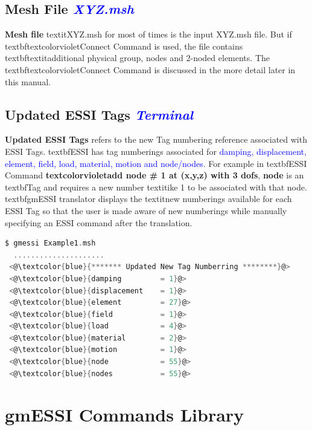 \documentclass[11pt]{article}
\begin{document}
\subsection{Mesh File \textcolor{blue}{\textit{XYZ.msh}}}

\textbf{Mesh file} textit{XYZ.msh} for most of times is the input XYZ.msh
file. But if textbf{textcolor{violet}{Connect Command}} is used, the file
contains textbf{textit{additional physical group, nodes and 2-noded
elements}}. The textbf{textcolor{violet}{Connect Command}} is discussed in
the more detail later in this manual.

\subsection{Updated ESSI Tags \textcolor{blue}{\textit{Terminal}}}

\textbf{Updated ESSI Tags} refers to the new Tag numbering reference
associated with ESSI Tags. textbf{ESSI} has tag numberings associated for
\textcolor{blue}{damping, displacement, element, field, load, material, motion
and node/nodes}. For example in textbf{ESSI Command}
\textbf{textcolor{violet}{add node \# 1  at (x,y,z)  with 3 dofs}},
\textbf{node} is an textbf{Tag} and requires a new number textit{ike 1 to be
associated with that node}. textbf{gmESSI translator} displays the textit{new
numberings available for each ESSI Tag} so that the user is made aware of new
numberings while manually specifying an ESSI command after the translation.

\begin{lstlisting}[language=C]
$ gmessi Example1.msh
  .....................
 <@\textcolor{blue}{******* Updated New Tag Numberring ********}@>
 <@\textcolor{blue}{damping         = 1}@>
 <@\textcolor{blue}{displacement    = 1}@>
 <@\textcolor{blue}{element         = 27}@>
 <@\textcolor{blue}{field           = 1}@>
 <@\textcolor{blue}{load            = 4}@>
 <@\textcolor{blue}{material        = 2}@>
 <@\textcolor{blue}{motion          = 1}@>
 <@\textcolor{blue}{node            = 55}@>
 <@\textcolor{blue}{nodes           = 55}@>

\end{lstlisting}
 
\section{gmESSI Commands Library}
\end{document}
